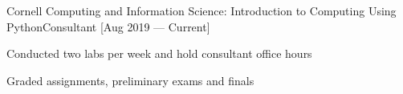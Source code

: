 \documentclass{resume}
\begin{document}
\begin{experience}
    \begin{entry}{Cornell Computing and Information Science: Introduction
        to Computing Using Python}{}{Consultant [Aug 2019 --- Current]}
        \begin{description}
            \item Conducted two labs per week and hold consultant office hours
            \item Graded assignments, preliminary exams and finals
        \end{description}
    \end{entry}
\end{experience}
\end{document}
